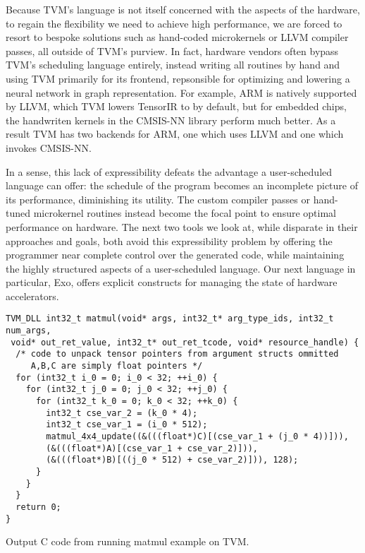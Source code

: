 \documentclass[acmsmall, nonacm=true]{acmart}
\begin{document}
Because TVM's language is not itself concerned with the aspects of the hardware, to regain the flexibility we need to achieve high performance, we are forced to resort to bespoke solutions such as hand-coded microkernels or LLVM compiler passes, all outside of TVM's purview. In fact, hardware vendors often bypass TVM's scheduling language entirely, instead writing all routines by hand and using TVM primarily for its frontend, repsonsible for optimizing and lowering a neural network in graph representation. For example, ARM is natively supported by LLVM, which TVM lowers TensorIR to by default, but for embedded chips, the handwriten kernels in the CMSIS-NN library perform much better. As a result TVM has two backends for ARM, one which uses LLVM and one which invokes CMSIS-NN.

In a sense, this lack of expressibility defeats the advantage a user-scheduled language can offer: the schedule of the program becomes an incomplete picture of its performance, diminishing its utility. The custom compiler passes or hand-tuned microkernel routines instead become the focal point to ensure optimal performance on hardware. The next two tools we look at, while disparate in their approaches and goals, both avoid this expressibility problem by offering the programmer near complete control over the generated code, while maintaining the highly structured aspects of a user-scheduled language. Our next language in particular, Exo, offers explicit constructs for managing the state of hardware accelerators.



\begin{listing}
\centering
\begin{verbatim}
TVM_DLL int32_t matmul(void* args, int32_t* arg_type_ids, int32_t num_args,
 void* out_ret_value, int32_t* out_ret_tcode, void* resource_handle) {
  /* code to unpack tensor pointers from argument structs ommitted
     A,B,C are simply float pointers */
  for (int32_t i_0 = 0; i_0 < 32; ++i_0) {
    for (int32_t j_0 = 0; j_0 < 32; ++j_0) {
      for (int32_t k_0 = 0; k_0 < 32; ++k_0) {
        int32_t cse_var_2 = (k_0 * 4);
        int32_t cse_var_1 = (i_0 * 512);
        matmul_4x4_update((&(((float*)C)[(cse_var_1 + (j_0 * 4))])),
        (&(((float*)A)[(cse_var_1 + cse_var_2)])),
        (&(((float*)B)[((j_0 * 512) + cse_var_2)])), 128);
      }
    }
  }
  return 0;
}
\end{verbatim}
\caption{Output C code from running matmul example on TVM.}
\label{lst:tvm_output}
\end{listing}
\end{document}
